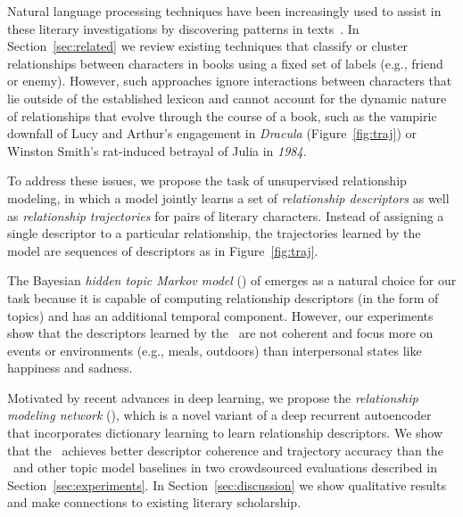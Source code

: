 Natural language processing techniques have been increasingly used to
assist in these literary investigations by discovering patterns in
texts~\cite{jockers-13}.  In Section~\ref{sec:related} we review
existing techniques that classify or cluster relationships between
characters in books using a fixed set of labels (e.g., friend or
enemy).  However, such approaches ignore interactions between
characters that lie outside of the established lexicon and cannot
account for the dynamic nature of relationships that evolve through
the course of a book, such as the vampiric downfall of Lucy and
Arthur's engagement in \textit{Dracula} (Figure~\ref{fig:traj}) or Winston Smith's
rat-induced betrayal of Julia in \textit{1984}.

To address these issues, we propose the task of unsupervised
relationship modeling, in which a model jointly learns a set of
\emph{relationship descriptors} as well as \emph{relationship
  trajectories} for pairs of literary characters. Instead of assigning
a single descriptor to a particular relationship, the trajectories
learned by the model are sequences of descriptors as in
Figure~\ref{fig:traj}.











The Bayesian \emph{hidden topic Markov model} (\htmm) of
 emerges as a natural choice for our task
because it is capable of computing relationship descriptors (in the
form of topics) and has an additional temporal component. However, our
experiments show that the descriptors learned by the \htmm\ are not
coherent and focus more on events or environments (e.g., meals,
outdoors) than interpersonal states like happiness and sadness.

Motivated by recent advances in deep learning, we propose the \emph{relationship
  modeling network} (\rmn), which is a novel variant of a deep recurrent
autoencoder that incorporates dictionary learning to learn relationship
descriptors. We show that the \rmn\ achieves better descriptor coherence and
trajectory accuracy than the \htmm\ and other topic model baselines in two
crowdsourced evaluations described in Section~\ref{sec:experiments}. In
Section~\ref{sec:discussion} we show qualitative results and make connections to
existing literary scholarship.


















